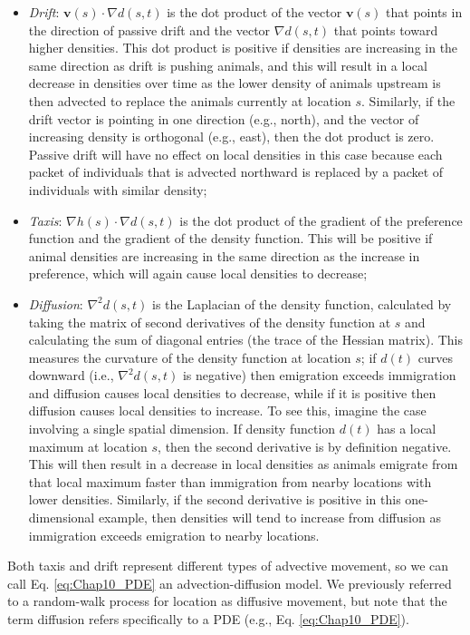\begin{itemize}
    \item \textit{Drift}:  \(\mathbf{v}(s) \cdot \nabla d(s,t)\) is the dot product of the vector \(\mathbf{v}(s)\) that points in the direction of passive drift and the vector \(\nabla d(s,t)\) that points toward higher densities.  This dot product is positive if densities are increasing in the same direction as drift is pushing animals, and this will result in a local decrease in densities over time as the lower density of animals upstream is then advected to replace the animals currently at location \(s\).  Similarly, if the drift vector is pointing in one direction (e.g., north), and the vector of increasing density is orthogonal (e.g., east), then the dot product is zero.  Passive drift will have no effect on local densities in this case because each packet of individuals that is advected northward is replaced by a packet of individuals with similar density;

    \item \textit{Taxis}: \(\nabla h(s) \cdot \nabla d(s,t)\) is the dot product of the gradient of the preference function and the gradient of the density function.  This will be positive if animal densities are increasing in the same direction as the increase in preference, which will again cause local densities to decrease;  

    \item \textit{Diffusion}:  \(\nabla^2 d(s,t)\) is the Laplacian of the density function, calculated by taking the matrix of second derivatives of the density function at \(s\) and calculating the sum of diagonal entries (the trace of the Hessian matrix).  This measures the curvature of the density function at location \(s\); if \(d(t)\) curves downward (i.e., \(\nabla^2 d(s,t)\) is negative) then emigration exceeds immigration and diffusion causes local densities to decrease, while if it is positive then diffusion causes local densities to increase.  To see this, imagine the case involving a single spatial dimension.  If density function \(d(t)\) has a local maximum at location \(s\), then the second derivative is by definition negative.  This will then result in a decrease in local densities as animals emigrate from that local maximum faster than immigration from nearby locations with lower densities. Similarly, if the second derivative is positive in this one-dimensional example, then densities will tend to increase from diffusion as immigration exceeds emigration to nearby locations.   
\end{itemize}
Both taxis and drift represent different types of advective movement, so we can call Eq. \ref{eq:Chap10_PDE} an advection-diffusion model. We previously referred to a random-walk process for location as diffusive movement, but note that the term diffusion refers specifically to a PDE (e.g., Eq. \ref{eq:Chap10_PDE}).

